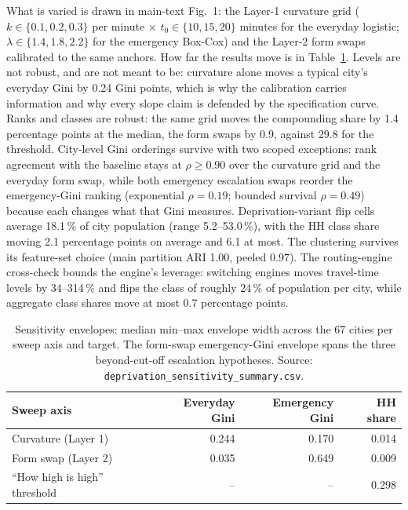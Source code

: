 \documentclass[11pt]{article}
\begin{document}
What is varied is drawn in main-text Fig.~1: the Layer-1 curvature grid
($k \in \{0.1, 0.2, 0.3\}$ per minute $\times$ $t_0 \in \{10, 15, 20\}$
minutes for the everyday logistic; $\lambda \in \{1.4, 1.8, 2.2\}$ for the
emergency Box-Cox) and the Layer-2 form swaps calibrated to the same
anchors. How far the results move is in Table~\ref{tab:envelopes}. Levels
are not robust, and are not meant to be: curvature alone moves a typical
city's everyday Gini by 0.24 Gini points, which is why the calibration
carries information and why every slope claim is defended by the
specification curve. Ranks and classes are robust: the same grid moves the
compounding share by 1.4 percentage points at the median, the form swaps
by 0.9, against 29.8 for the threshold. City-level Gini orderings survive
with two scoped exceptions: rank agreement with the baseline stays at
$\rho \geq 0.90$ over the curvature grid and the everyday form swap, while
both emergency escalation swaps reorder the emergency-Gini ranking
(exponential $\rho = 0.19$; bounded survival $\rho = 0.49$) because each
changes what that Gini measures. Deprivation-variant flip cells average
18.1\,\% of city population (range 5.2--53.0\,\%), with the HH class share
moving 2.1 percentage points on average and 6.1 at most. The clustering
survives its feature-set choice (main partition ARI 1.00, peeled 0.97).
The routing-engine cross-check bounds the engine's leverage: switching
engines moves travel-time levels by 34--314\,\% and flips the class of
roughly 24\,\% of population per city, while aggregate class shares move
at most 0.7 percentage points.

\begin{table}[H]
\centering
\caption{Sensitivity envelopes: median min--max envelope width across the
67 cities per sweep axis and target. The form-swap emergency-Gini
envelope spans the three beyond-cut-off escalation hypotheses. Source:
\texttt{deprivation\_sensitivity\_summary.csv}.}
\label{tab:envelopes}
\small
\begin{tabular}{@{}lrrr@{}}
\toprule
Sweep axis & Everyday Gini & Emergency Gini & HH share \\
\midrule
Curvature (Layer 1)            & 0.244 & 0.170 & 0.014 \\
Form swap (Layer 2)            & 0.035 & 0.649 & 0.009 \\
``How high is high'' threshold & --    & --    & 0.298 \\
\bottomrule
\end{tabular}
\end{table}
\end{document}
